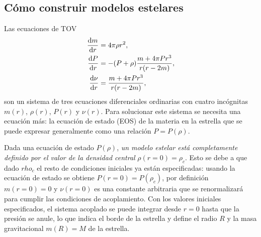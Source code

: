 \subsection{Cómo construir modelos estelares}\label{SMABC}

\noindent Las ecuaciones de TOV
\begin{align*}
    \dv{m}{r} &= 4\pi \rho r^2, \\
    \dv{P}{r} &= -(P+\rho)\frac{m+4\pi P r^3}{r\qty(r-2m)}, \\
    \dv{\nu}{r} &= \frac{m+4\pi P r^3}{r\qty(r-2m)},
\end{align*}
son un sistema de tres ecuaciones diferenciales ordinarias con cuatro incógnitas $m(r)$, $\rho(r)$, $P(r)$ y $\nu(r)$. Para solucionar este sistema se necesita una ecuación más: la ecuación de estado (EOS) de la materia en la estrella que se puede expresar generalmente como una relación $P=P(\rho)$. 

Dada una ecuación de estado $P(\rho)$, \emph{un modelo estelar está completamente definido por el valor de la densidad central} $\rho(r=0)=\rho_c$. Esto se debe a que dado $rho_c$ el resto de condiciones iniciales ya están especificadas: usando la ecuación de estado se obtiene $P(r=0)=P(\rho_c)$, por definición $m(r=0)=0$ y $\nu(r=0)$ es una constante arbitraria que se renormalizará para cumplir las condiciones de acoplamiento. Con los valores iniciales especificados, el sistema acoplado se puede integrar desde $r=0$ hasta que la presión se anule, lo que indica el borde de la estrella y define el radio $R$ y la masa gravitacional $m(R)=M$ de la estrella. 



